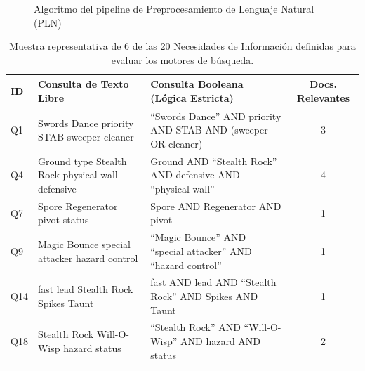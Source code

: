\documentclass[conference,a4paper]{IEEEtran}
\begin{document}
\begin{figure}[htbp]
  \centering
  \caption{Algoritmo del pipeline de Preprocesamiento de Lenguaje Natural (PLN)}
  \label{pcd:preprocesamiento}
\end{figure}

\begin{table}[t]
  \caption{Muestra representativa de 6 de las 20 Necesidades de Información definidas para evaluar los motores de búsqueda.}
  \label{tab:necesidades}
  \centering
  \begin{tabularx}{\textwidth}{p{0.5cm} p{6cm} p{7cm} c}
    \toprule
    \textbf{ID} & \textbf{Consulta de Texto Libre} & \textbf{Consulta Booleana (Lógica Estricta)} & \textbf{Docs. Relevantes} \\
    \midrule
    Q1 & Swords Dance priority STAB sweeper cleaner & ``Swords Dance'' AND priority AND STAB AND (sweeper OR cleaner) & 3 \\
    \midrule
    Q4 & Ground type Stealth Rock physical wall defensive & Ground AND ``Stealth Rock'' AND defensive AND ``physical wall'' & 4 \\
    \midrule
    Q7 & Spore Regenerator pivot status & Spore AND Regenerator AND pivot & 1 \\
    \midrule
    Q9 & Magic Bounce special attacker hazard control & ``Magic Bounce'' AND ``special attacker'' AND ``hazard control'' & 1 \\
    \midrule
    Q14 & fast lead Stealth Rock Spikes Taunt & fast AND lead AND ``Stealth Rock'' AND Spikes AND Taunt & 1 \\
    \midrule
    Q18 & Stealth Rock Will-O-Wisp hazard status & ``Stealth Rock'' AND ``Will-O-Wisp'' AND hazard AND status & 2 \\
    \bottomrule
  \end{tabularx}
\end{table}
\end{document}
